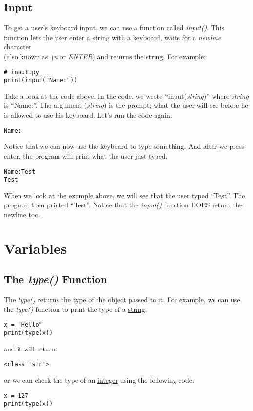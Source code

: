\subsection*{Input}
To get a user's keyboard input, we can use a function called \emph{input()}.
This function lets the user enter a string with a keyboard, waits for a \emph{newline} character \\
(also known as \emph{\textbackslash n} or \emph{ENTER}) and returns the string.
For example:
\begin{lstlisting}
# input.py
print(input("Name:"))
\end{lstlisting}
Take a look at the code above. In the code, we wrote ``input(\emph{string})'' where \emph{string} is ``Name:''.
The argument (\emph{string}) is the prompt; what the user will see before he is allowed to use his keyboard.
Let's run the code again:
\begin{lstlisting}[language=Text]
Name:
\end{lstlisting}
Notice that we can now use the keyboard to type something.
And after we press enter, the program will print what the user just typed.
\begin{lstlisting}[language=Text]
Name:Test
Test
\end{lstlisting}
When we look at the example above, we will see that the user typed ``Test''.
The program then printed ``Test''.
Notice that the \emph{input()} function DOES return the newline too.
\section*{Variables}
\subsection*{The \emph{type()} Function}
The \emph{type()} returns the type of the object passed to it.
For example, we can use the \emph{type()} function to print the type of a \hyperref[subsec:strings]{string}:
\begin{lstlisting}
x = "Hello"
print(type(x))
\end{lstlisting}
and it will return:
\begin{lstlisting}[language=Text]
<class 'str'>
\end{lstlisting}
or we can check the type of an \hyperref[subsec:integers]{integer} using the following code:
\begin{lstlisting}
x = 127
print(type(x))
\end{lstlisting}
